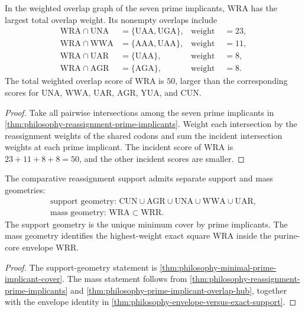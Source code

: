 \begin{theorem}
\label{thm:philosophy-prime-implicant-overlap-hub}
In the weighted overlap graph of the seven prime implicants,
$\mathrm{WRA}$ has the largest total overlap weight. Its nonempty
overlaps include
$$
\begin{aligned}
  \mathrm{WRA}\cap\mathrm{UNA}
    &=\{\mathrm{UAA},\mathrm{UGA}\},
    &\text{weight }&=23,\\
  \mathrm{WRA}\cap\mathrm{WWA}
    &=\{\mathrm{AAA},\mathrm{UAA}\},
    &\text{weight }&=11,\\
  \mathrm{WRA}\cap\mathrm{UAR}
    &=\{\mathrm{UAA}\},
    &\text{weight }&=8,\\
  \mathrm{WRA}\cap\mathrm{AGR}
    &=\{\mathrm{AGA}\},
    &\text{weight }&=8.
\end{aligned}
$$
The total weighted overlap score of $\mathrm{WRA}$ is $50$, larger than
the corresponding scores for $\mathrm{UNA}$, $\mathrm{WWA}$,
$\mathrm{UAR}$, $\mathrm{AGR}$, $\mathrm{YUA}$, and $\mathrm{CUN}$.
\end{theorem}
\begin{proof}
Take all pairwise intersections among the seven prime implicants in
\autoref{thm:philosophy-reassignment-prime-implicants}. Weight each
intersection by the reassignment weights of the shared codons and sum
the incident intersection weights at each prime implicant. The incident
score of $\mathrm{WRA}$ is $23+11+8+8=50$, and the other incident
scores are smaller.
\end{proof}

\begin{theorem}
\label{thm:philosophy-support-compression-statement}
The comparative reassignment support admits separate support and mass
geometries:
$$
\begin{gathered}
  \text{support geometry: }
  \mathrm{CUN}\cup\mathrm{AGR}\cup\mathrm{UNA}
  \cup\mathrm{WWA}\cup\mathrm{UAR},\\
  \text{mass geometry: }
  \mathrm{WRA}\subset\mathrm{WRR}.
\end{gathered}
$$
The support geometry is the unique minimum cover by prime implicants.
The mass geometry identifies the highest-weight exact square
$\mathrm{WRA}$ inside the purine-core envelope $\mathrm{WRR}$.
\end{theorem}
\begin{proof}
The support-geometry statement is
\autoref{thm:philosophy-minimal-prime-implicant-cover}. The mass
statement follows from
\autoref{thm:philosophy-reassignment-prime-implicants} and
\autoref{thm:philosophy-prime-implicant-overlap-hub}, together with
the envelope identity in
\autoref{thm:philosophy-envelope-versus-exact-support}.
\end{proof}
